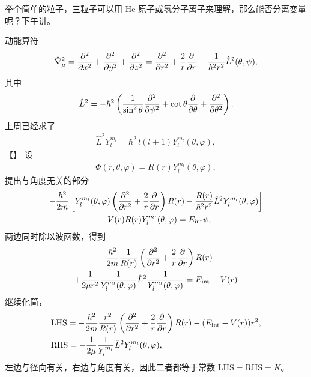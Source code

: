 举个简单的粒子，三粒子可以用 He 原子或氢分子离子来理解，那么能否分离变量呢？下午讲。

动能算符
\begin{align}
     \hat \nabla^2_\mu = \pdv[2]x + \pdv[2]y + \pdv[2]z = \pdv[2]r + \frac2r \pdv{r} - \frac1{\hbar^2r^2} \hat L^2 (\theta, \psi), 
\end{align}
其中
\begin{align}
    \hat L^2 = -\hbar^2 \left(
        \frac1{\sin^2\theta} \pdv[2]{\psi} + \cot\theta \pdv{\theta} + \pdv[2]\theta
    \right). 
\end{align}
上周已经求了
\begin{align}
    \hat L^2 Y_l^{m_l} = \hbar^2 \,l(l+1) Y_l^{m_l}(\theta,\varphi), 
\end{align}
【】
设
\begin{align}
    \Phi(r,\theta,\varphi) = R(r) Y_l^{m_l} (\theta,\varphi),
\end{align}
提出与角度无关的部分
\begin{multline}
    -\frac{\hbar^2}{2m} 
    \left[
    Y_l^{m_l} (\theta,\varphi) \left(\pdv[2]r + \frac2r \pdv{r}\right) R(r) - \frac{R(r)}{\hbar^2r^2} \hat L^2 Y_l^{m_l} (\theta,\varphi)
    \right] \\
    + V(r) R(r) Y_l^{m_l} (\theta, \varphi) = E_{\mathrm {int}}\psi,
\end{multline}
两边同时除以波函数，得到
\begin{multline}
    -\frac{\hbar^2}{2m} \frac1{R(r)} 
    \left(\pdv[2]r + \frac2r \pdv{r}\right) R(r)  \\ + \frac1{2\mu r^2} \frac1{Y_l^{m_l}(\theta,\varphi)} \hat L^2 \frac1{Y_l^{m_l}(\theta,\varphi)}  = E_{\mathrm{int}} - V(r)
\end{multline}
继续化简，
\begin{align}
    &\text{LHS} = -\frac{\hbar^2}{2m} \frac{r^2}{R(r)} 
    \left(\pdv[2]r + \frac2r \pdv{r}\right) R(r) - (E_{\mathrm{int}} - V(r)) r^2, \\
    &\text{RHS} = -\frac1{2\mu} \frac1{Y_l^{m_l}} \hat L^2 Y_l^{m_l}(\theta,\varphi),
\end{align}
左边与径向有关，右边与角度有关，因此二者都等于常数 $\text{LHS} = \text{RHS} = K$。

